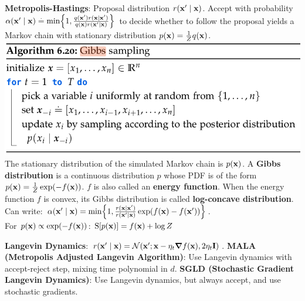 \textbf{Metropolis-Hastings}: Proposal distribution \(r(\mathbf{x'}\mid \mathbf{x})\). Accept with probability $\alpha(\vxp \mid \vx) \defeq \min \braces*{1, \frac{q(\vxp) r(\vx \mid \vxp)}{q(\vx) r(\vxp \mid \vx)}}$ to decide whether to follow the proposal yields a Markov chain with stationary distribution $p(\mathbf{x}) = \frac{1}{Z} q(\mathbf{x})$.
\includegraphics[width=0.98\linewidth]{images/Gibbs_Sampling.png} 
The stationary distribution of the simulated Markov chain is $p(\mathbf{x})$.
A \textbf{Gibbs distribution} is a continuous distribution $p$ whose PDF is of the form $p(\mathbf{x}) = \frac{1}{Z} \exp(- f(\mathbf{x}))$. $f$ is also called an \textbf{energy function}.
When the energy function $f$ is convex, its Gibbs distribution is called \textbf{log-concave distribution}. Can write: $\alpha(\vxp \mid \vx) = \min \braces*{1, \frac{r(\vx \mid \vxp)}{r(\vxp \mid \vx)} \exp(f(\vx) - f(\vxp))}$. \\
For $p(\mathbf{x}) \propto \exp(-f(\mathbf{x}))$: $\S{p(\vx)} = f(\vx) + \log Z$
\begin{framed}
    \textbf{Langevin Dynamics}: $r(\vxp \mid \vx) = \N[\vxp]{\vx - \eta_t \grad f(\vx)}{2 \eta_t \mI}$.
\textbf{MALA (Metropolis Adjusted Langevin Algorithm)}: Use Langevin dynamics with accept-reject step, mixing time polynomial in \(d\).
\textbf{SGLD (Stochastic Gradient Langevin Dynamics)}: Use Langevin dynamics, but always accept, and use stochastic gradients.
\end{framed}

